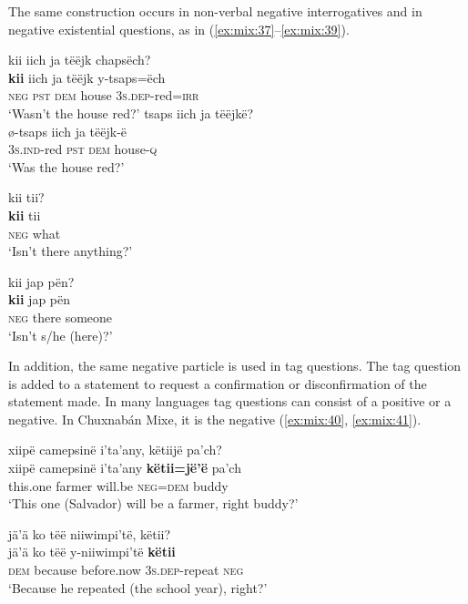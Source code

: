 \documentclass[output=paper,colorlinks,citecolor=brown,draft]{langscibook}
\begin{document}
The same construction occurs in non-verbal negative interrogatives and in negative existential questions, as in (\ref{ex:mix:37}--\ref{ex:mix:39}). 

\ea\label{ex:mix:37}
    \ea\label{ex:mix:37a}
        \glll kii iich ja tëëjk chapsëch?\\ 
              \textbf{kii} iich ja tëëjk y-tsaps=ëch\\
              \textsc{neg} \textsc{pst} \textsc{dem} house \textsc{3s.dep-}red=\textsc{irr}\\
        \glt ‘Wasn’t the house red?’
    \ex\label{ex:mix:37b}
        \glll tsaps iich ja tëëjkë? \\
             ø-tsaps iich ja tëëjk-ë \\ 
             \textsc{3s.ind-}red \textsc{pst} \textsc{dem} house-\textsc{q}\\
        \glt ‘Was the house red?’
    \z
\z 

\ea\label{ex:mix:38}
    \glll  kii tii?\\
         \textbf{kii} tii\\
         \textsc{neg} what\\
    \glt ‘Isn’t there anything?’
\z

\ea\label{ex:mix:39}
    \glll kii jap pën?\\
         \textbf{kii} jap pën\\
        \textsc{neg} there someone \\
    \glt ‘Isn’t s/he (here)?’
\z

In addition, the same negative particle is used in tag questions. The tag question is added to a statement to request a confirmation or disconfirmation of the statement made. In many languages tag questions can consist of a positive or a negative. In Chuxnabán Mixe, it is the negative (\ref{ex:mix:40}, \ref{ex:mix:41}).

\ea\label{ex:mix:40}
    \glll xiipë camepsinë i'ta’any, këtiijë pa’ch?\\
        xiipë camepsinë i'ta’any \textbf{këtii=jë’ë} pa’ch\\
        this.one farmer will.be \textsc{neg=dem} buddy\\
    \glt ‘This one (Salvador) will be a farmer, right buddy?’
\z

\ea\label{ex:mix:41}
    \glll jä’ä ko tëë niiwimpi’të, këtii?\\
        jä’ä ko tëë y-niiwimpi’të \textbf{këtii}\\
        \textsc{dem} because before.now \textsc{3s.dep}{}-repeat \textsc{neg} \\
    \glt ‘Because he repeated (the school year), right?’ 
\z
\end{document}
